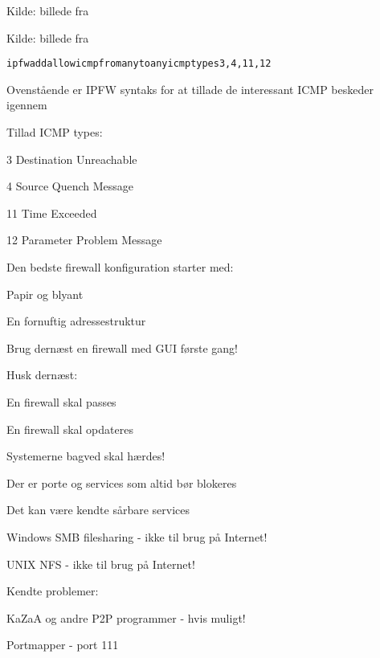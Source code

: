\documentclass[Screen16to9,17pt]{foils}
\begin{document}
Kilde: billede fra 




Kilde: billede fra 



\begin{alltt}
ipfw add allow icmp from any to any icmptypes 3,4,11,12
\end{alltt}

\begin{list1}
\item Ovenstående er IPFW syntaks for at tillade de interessant ICMP beskeder igennem
\item Tillad ICMP types:
\begin{list2}
\item 3 Destination Unreachable
\item 4 Source Quench Message
\item 11 Time Exceeded
\item 12 Parameter Problem Message
\end{list2}
\end{list1}


\begin{list1}
\item Den bedste firewall konfiguration starter med:
\begin{list2}
\item Papir og blyant
\item En fornuftig adressestruktur
\end{list2}
\item Brug dernæst en firewall med GUI første gang!
\item Husk dernæst:
\begin{list2}
\item En firewall skal passes
\item En firewall skal opdateres
\item Systemerne bagved skal hærdes!
\end{list2}
\end{list1}


\begin{list1}
\item Der er porte og services som altid bør blokeres
\item Det kan være kendte sårbare services
\begin{list2}
\item Windows SMB filesharing - ikke til brug på Internet!
\item UNIX NFS - ikke til brug på Internet!
\end{list2}
\item Kendte problemer:
\begin{list2}
\item KaZaA og andre P2P programmer - hvis muligt!
\item Portmapper - port 111
\end{list2}
\end{list1}
\end{document}
